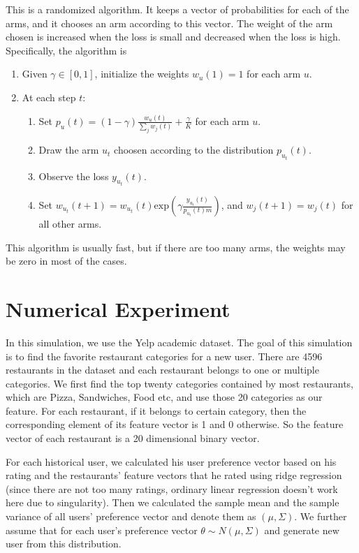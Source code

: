 \documentclass{article}
\theoremstyle{plain}
\theoremstyle{definition}
\begin{document}
This is a randomized algorithm. It keeps a vector of probabilities
for each of the arms, and it chooses an arm according to this vector.
The weight of the arm chosen is increased when the loss is small and
decreased when the loss is high. Specifically, the algorithm is
\begin{enumerate}
\item Given $\gamma\in\left[0,1\right]$, initialize the weights $w_{u}\left(1\right)=1$
for each arm $u$.
\item At each step $t$:

\begin{enumerate}
\item Set $p_{u}\left(t\right)=\left(1-\gamma\right)\frac{w_{u}\left(t\right)}{\sum_{j}w_{j}\left(t\right)}+\frac{\gamma}{K}$
for each arm $u$.
\item Draw the arm $u_{t}$ choosen according to the distribution $p_{u_{t}}\left(t\right)$.
\item Observe the loss $y_{u_{t}}\left(t\right)$.
\item Set $w_{u_{t}}\left(t+1\right)=w_{u_{t}}\left(t\right)\mbox{exp}\left(\gamma\frac{y_{u_{t}}\left(t\right)}{p_{u_{t}}\left(t\right)m}\right)$,
and $w_{j}\left(t+1\right)=w_{j}\left(t\right)$ for all other arms. 
\end{enumerate}
\end{enumerate}
This algorithm is usually fast, but if there are too many arms, the
weights may be zero in most of the cases. 



\section{Numerical Experiment}
In this simulation, we use the Yelp academic dataset. The goal of this simulation is to find the favorite restaurant categories for a new user. There are 4596 restaurants in the dataset and each restaurant belongs to one or multiple categories. We first find the top twenty categories contained by most restaurants, which are Pizza, Sandwiches, Food etc, and use those 20 categories as our feature. For each restaurant, if it belongs to certain category, then the corresponding element of its feature vector is 1 and 0 otherwise. So the feature vector of each restaurant is a 20 dimensional binary vector. 

For each historical user, we calculated his user preference vector based on his rating and the restaurants' feature vectors that he rated using ridge regression (since there are not too many ratings, ordinary linear regression doesn't work here due to singularity). Then we calculated the sample mean and the sample variance of all users' preference vector and denote them as $(\mu,\Sigma)$. We further assume that for each user's preference vector $\theta\sim N(\mu,\Sigma)$ and generate new user from this distribution.
\end{document}
